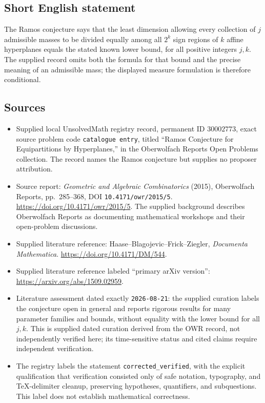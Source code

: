\documentclass[11pt]{article}
\begin{document}
\subsection{Short English statement}
The Ramos conjecture says that the least dimension allowing every collection of \(j\) admissible masses to be divided equally among all \(2^k\) sign regions of \(k\) affine hyperplanes equals the stated known lower bound, for all positive integers \(j,k\). The supplied record omits both the formula for that bound and the precise meaning of an admissible mass; the displayed measure formulation is therefore conditional.
\subsection{Sources}
\begin{itemize}
\item Supplied local UnsolvedMath registry record, permanent ID \(30002773\), exact source problem code \texttt{catalogue entry}, titled ``Ramos Conjecture for Equipartitions by Hyperplanes,'' in the Oberwolfach Reports Open Problems collection. The record names the Ramos conjecture but supplies no proposer attribution.
\item Source report: \emph{Geometric and Algebraic Combinatorics} (2015), Oberwolfach Reports, pp.~285--368, DOI \texttt{10.4171/owr/2015/5}. \url{https://doi.org/10.4171/owr/2015/5}. The supplied background describes Oberwolfach Reports as documenting mathematical workshops and their open-problem discussions.
\item Supplied literature reference: Haase--Blagojevic--Frick--Ziegler, \emph{Documenta Mathematica}. \url{https://doi.org/10.4171/DM/544}.
\item Supplied literature reference labeled ``primary arXiv version'': \url{https://arxiv.org/abs/1509.02959}.
\item Literature assessment dated exactly \texttt{2026-08-21}: the supplied curation labels the conjecture open in general and reports rigorous results for many parameter families and bounds, without equality with the lower bound for all \(j,k\). This is supplied dated curation derived from the OWR record, not independently verified here; its time-sensitive status and cited claims require independent verification.
\item The registry labels the statement \texttt{corrected\_verified}, with the explicit qualification that verification consisted only of safe notation, typography, and TeX-delimiter cleanup, preserving hypotheses, quantifiers, and subquestions. This label does not establish mathematical correctness.
\end{itemize}
\end{document}
